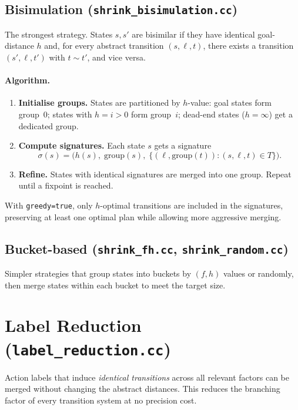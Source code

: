 \documentclass[11pt,a4paper]{article}
\begin{document}
\subsection{Bisimulation (\texttt{shrink\_bisimulation.cc})}

The strongest strategy.  States $s, s'$ are bisimilar if they have identical
goal-distance $h$ and, for every abstract transition $(s, \ell, t)$, there
exists a transition $(s', \ell, t')$ with $t \sim t'$, and vice versa.

\paragraph{Algorithm.}
\begin{enumerate}
  \item \textbf{Initialise groups.}  States are partitioned by $h$-value:
        goal states form group~0; states with $h = i > 0$ form group~$i$;
        dead-end states ($h = \infty$) get a dedicated group.
  \item \textbf{Compute signatures.}  Each state $s$ gets a signature
        \[
          \sigma(s) = \bigl(h(s),\; \text{group}(s),\;
            \{(\ell, \text{group}(t)) : (s,\ell,t) \in T\}\bigr).
        \]
  \item \textbf{Refine.}  States with identical signatures are merged into one
        group.  Repeat until a fixpoint is reached.
\end{enumerate}

With \texttt{greedy=true}, only $h$-optimal transitions are included in the
signatures, preserving at least one optimal plan while allowing more aggressive
merging.

\subsection{Bucket-based (\texttt{shrink\_fh.cc}, \texttt{shrink\_random.cc})}

Simpler strategies that group states into buckets by $(f, h)$ values or
randomly, then merge states within each bucket to meet the target size.

\section{Label Reduction (\texttt{label\_reduction.cc})}

Action labels that induce \emph{identical transitions} across all relevant
factors can be merged without changing the abstract distances.  This reduces
the branching factor of every transition system at no precision cost.
\end{document}
